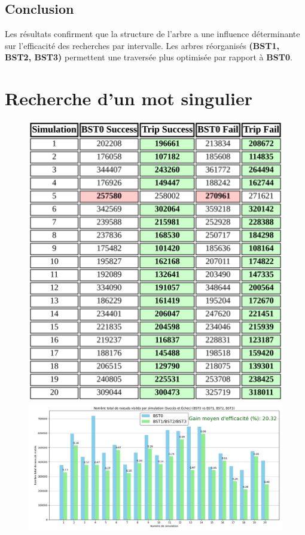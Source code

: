 \documentclass{article}
\begin{document}
\subsection{Conclusion}
\small
Les résultats confirment que la structure de l’arbre a une influence déterminante sur l’efficacité des recherches par intervalle. Les arbres réorganisés \textbf{(BST1, BST2, BST3)} permettent une traversée plus optimisée par rapport à \textbf{BST0}.

\section{Recherche d'un mot singulier}

\begin{figure}[h]
\centering
\begin{minipage}{0.30\textwidth}
	\includegraphics[width=\linewidth, scale=0.05]{tsws}
\end{minipage}
\begin{minipage}{0.60\textwidth}
	\includegraphics[width=\linewidth, scale=0.5]{sws}
\end{minipage}
\end{figure}
\end{document}
